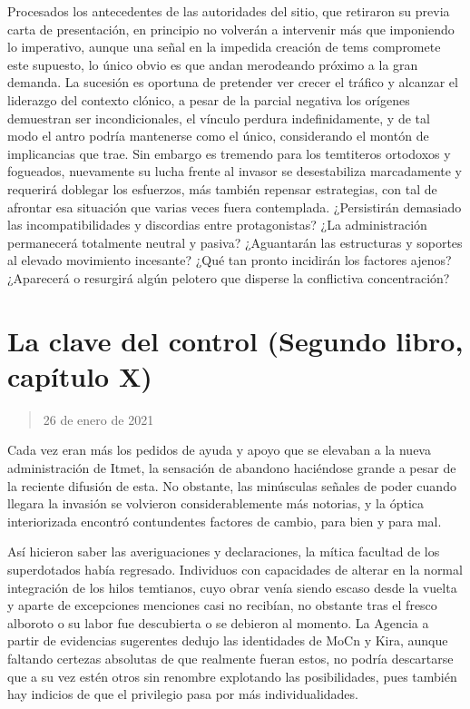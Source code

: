 \documentclass[
]{book}
\begin{document}
Procesados los antecedentes de las autoridades del sitio, que retiraron su previa carta de presentación, en principio no volverán a intervenir más que imponiendo lo imperativo, aunque una señal en la impedida creación de tems compromete este supuesto, lo único obvio es que andan merodeando próximo a la gran demanda. La sucesión es oportuna de pretender ver crecer el tráfico y alcanzar el liderazgo del contexto clónico, a pesar de la parcial negativa los orígenes demuestran ser incondicionales, el vínculo perdura indefinidamente, y de tal modo el antro podría mantenerse como el único, considerando el montón de implicancias que trae. Sin embargo es tremendo para los temtiteros ortodoxos y fogueados, nuevamente su lucha frente al invasor se desestabiliza marcadamente y requerirá doblegar los esfuerzos, más también repensar estrategias, con tal de afrontar esa situación que varias veces fuera contemplada. ¿Persistirán demasiado las incompatibilidades y discordias entre protagonistas? ¿La administración permanecerá totalmente neutral y pasiva? ¿Aguantarán las estructuras y soportes al elevado movimiento incesante? ¿Qué tan pronto incidirán los factores ajenos? ¿Aparecerá o resurgirá algún pelotero que disperse la conflictiva concentración?

\hypertarget{la-clave-del-control-segundo-libro-capuxedtulo-x}{%
\section{La clave del control (Segundo libro, capítulo X)}\label{la-clave-del-control-segundo-libro-capuxedtulo-x}}

\begin{quote}
26 de enero de 2021
\end{quote}

Cada vez eran más los pedidos de ayuda y apoyo que se elevaban a la nueva administración de Itmet, la sensación de abandono haciéndose grande a pesar de la reciente difusión de esta. No obstante, las minúsculas señales de poder cuando llegara la invasión se volvieron considerablemente más notorias, y la óptica interiorizada encontró contundentes factores de cambio, para bien y para mal.

Así hicieron saber las averiguaciones y declaraciones, la mítica facultad de los superdotados había regresado. Individuos con capacidades de alterar en la normal integración de los hilos temtianos, cuyo obrar venía siendo escaso desde la vuelta y aparte de excepciones menciones casi no recibían, no obstante tras el fresco alboroto o su labor fue descubierta o se debieron al momento. La Agencia a partir de evidencias sugerentes dedujo las identidades de MoCn y Kira, aunque faltando certezas absolutas de que realmente fueran estos, no podría descartarse que a su vez estén otros sin renombre explotando las posibilidades, pues también hay indicios de que el privilegio pasa por más individualidades.
\end{document}
